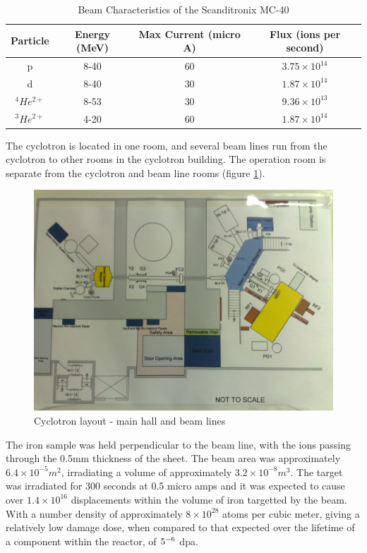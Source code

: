 \begin{table}[h]
\begin{center}
\begin{tabular}{c c c c}
\hline\hline
Particle & Energy (MeV) & Max Current (micro A) & Flux (ions per second)\\
\hline\hline
p & 8-40 & 60 & $3.75 \times 10^14$ \\
d & 8-40 & 30 & $1.87 \times 10^14$ \\
${}^4 He^{2+}$ & 8-53 & 30 & $9.36 \times 10^13$ \\
${}^3 He^{2+}$ & 4-20 & 60 & $1.87 \times 10^14$ \\
\hline\hline
\end{tabular}
\end{center}
\caption{Beam Characteristics of the Scanditronix MC-40}
\label{table:scanditronixlimits}
\end{table}

The cyclotron is located in one room, and several beam lines run from the cyclotron to other rooms in the cyclotron building.  The operation room is separate from the cyclotron and beam line rooms (figure \ref{fig:cyclotronlayout}).

\begin{figure}[htp]
  \begin{center}
    \includegraphics[scale=0.7]{chapters/activity_code/images/cyclotron_layout.png}
    \caption{Cyclotron layout - main hall and beam lines}
    \label{fig:cyclotronlayout}
  \end{center}
\end{figure}

The iron sample was held perpendicular to the beam line, with the ions passing through the 0.5mm thickness of the sheet.  The beam area was approximately $6.4 \times 10^{-5} m^2$, irradiating a volume of approximately $3.2 \times 10^{-8} m^3$.  The target was irradiated for 300 seconds at 0.5 micro amps and it was expected to cause over $1.4 \times 10^{16}$ displacements within the volume of iron targetted by the beam.  With a number density of approximately $8\times10^{28}$ atoms per cubic meter, giving a relatively low damage dose, when compared to that expected over the lifetime of a component within the reactor, of $5 \time 10^{-6}$ \acrshort{dpa}.

